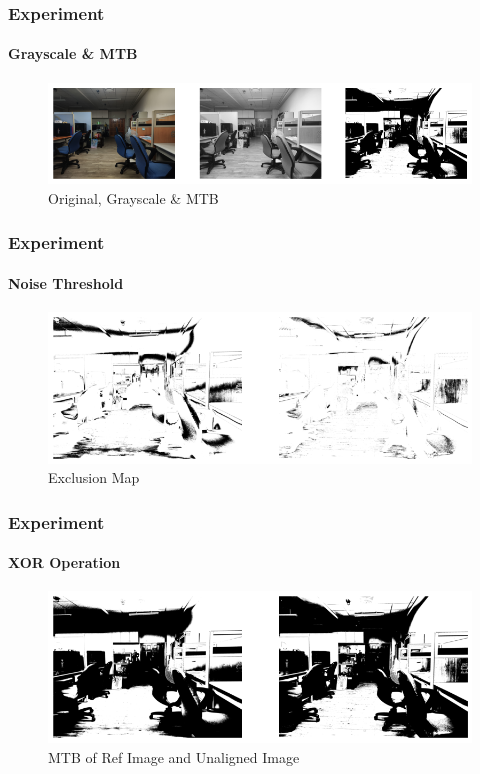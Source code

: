 \documentclass[
	11pt, %
	aspectratio=169, %
]{beamer}
\begin{document}
\begin{frame}
	\frametitle{Experiment}
	\framesubtitle{Grayscale \& MTB}

	\begin{figure}
		\includegraphics[width=\linewidth]{./Images/mtb_image.png}
		\caption{Original, Grayscale \& MTB}
	\end{figure}
\end{frame}

\begin{frame}
	\frametitle{Experiment}
	\framesubtitle{Noise Threshold}

	\begin{figure}
		\includegraphics[width=\linewidth]{./Images/mtb_exclusion_map.png}
		\caption{Exclusion Map}
	\end{figure}
\end{frame}

\begin{frame}
	\frametitle{Experiment}
	\framesubtitle{XOR Operation}

	\begin{figure}
		\includegraphics[width=\linewidth]{./Images/mtb_diff_operand.png}
		\caption{MTB of Ref Image and Unaligned Image}
	\end{figure}
\end{frame}
\end{document}

